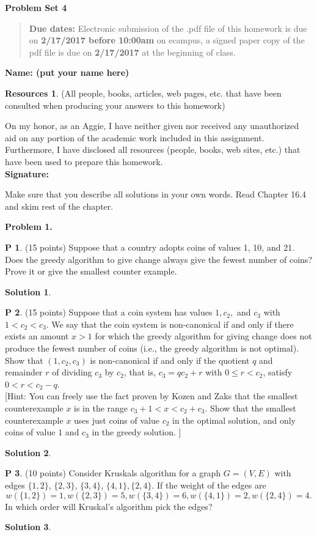 \documentclass{article}
\theoremstyle{definition}
\newtheorem{problem}{P}
\newtheorem*{solution}{Solution}
\newtheorem*{resources}{Resources}
\newcommand{\name}[1]{\noindent\textbf{Name: #1}}
\newcommand{\honor}{\noindent On my honor, as an Aggie, I have neither
  given nor received any unauthorized aid on any portion of the
  academic work included in this assignment. Furthermore, I have
  disclosed all resources (people, books, web sites, etc.) that have
  been used to prepare this homework. \\[1ex]
 \textbf{Signature:} \underline{\hspace*{5cm}} }
\newcommand{\problemset}[1]{\begin{center}\textbf{Problem Set #1}\end{center}}
\newcommand{\duedate}[2]{\begin{quote}\textbf{Due dates:} Electronic
    submission of the .pdf file of this homework is due on \textbf{#1} on ecampus, a signed paper copy
    of the pdf file is due on \textbf{#2} at the beginning of
    class. \end{quote} }
\begin{document}
\problemset{4}
\duedate{2/17/2017 before 10:00am}{2/17/2017}
\name{ (put your name here)}
\begin{resources} (All people, books, articles, web pages, etc. that
  have been consulted when producing your answers to this homework)
\end{resources}
\honor

\newpage
\noindent Make sure that you describe all solutions in your own words. Read Chapter 16.4 and skim rest of the chapter. \medskip


\noindent\textbf{Problem 1. }
\begin{problem} (15 points)
Suppose that a country adopts coins of values 1, 10, and 21. Does the
greedy algorithm to give change always give the fewest number of
coins?  Prove it or give the smallest counter example. 
\end{problem}
\begin{solution}
\end{solution}

\begin{problem} (15 points)
Suppose that a coin system has values $1, c_2,$ and  $c_3$ with
$1<c_2<c_3$. We say that the coin system is non-canonical if and only
if there exists an amount $x>1$ for which the greedy algorithm for
giving change does not produce the fewest number of coins (i.e., the
greedy algorithm is not optimal). Show that $(1,c_2,c_3)$ is
non-canonical if and only if the quotient $q$ and remainder $r$ of
dividing $c_3$ by $c_2$, that is, 
$c_3 = qc_2+r$ with $0\le r<c_2$, 
satisfy $0< r < c_2 - q$. \\{}
[Hint: You can freely use the fact proven by Kozen and Zaks that the 
smallest counterexample $x$ is in the range $c_3+1 < x < c_2+c_3$.
Show that the smallest counterexample $x$ uses just coins of value
$c_2$ in the optimal solution, and only coins of value $1$ and $c_3$
in the greedy solution. ]
\end{problem}
\begin{solution}
\end{solution}

\begin{problem} (10 points)
Consider Kruskals algorithm for a graph $G=(V,E)$ with edges 
$\{1,2\}$, $\{2,3\}$, $\{3,4\}$, $\{4,1\}, \{2,4\}$. If the weight of the edges
are 
$$ w(\{1,2\})=1, w(\{2,3\})=5, w(\{3,4\})=6, w(\{4,1\})=2, w(\{2,4\})=4.$$
In which order will Kruskal's algorithm pick the edges? 
\end{problem}
\begin{solution}
\end{solution}
\end{document}
